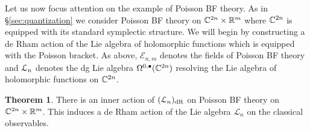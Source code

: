 \documentclass[11pt, oneside, reqno]{amsart}
\theoremstyle{definition} \newtheorem{definition}{Definition}[section]
\newtheorem{theorem}[definition]{Theorem}
\theoremstyle{definition}
\theoremstyle{remark}
\theoremstyle{definition} \newtheorem{remark}[definition]{Remark}
\theoremstyle{definition} \newtheorem{remarks}[definition]{Remarks}
\theoremstyle{definition} \newtheorem{question}[definition]{Question}
\theoremstyle{definition} \newtheorem*{note}{Note}
\theoremstyle{definition} \newtheorem{example}[definition]{Example}
\theoremstyle{definition} \newtheorem{examples}[definition]{Examples}
\def\bu{\bullet}
\def\cE{\mathcal E}\def\cF{\mathcal F}\def\cG{\mathcal G}\def\cH{\mathcal H}
\newcommand{\mc}[1]{\mathcal{#1}}
\begin{document}
Let us now focus attention on the example of Poisson BF theory.  
As in \S \ref{sec:quantization} we consider Poisson BF theory on $\mathbb C^{2n}\times \mathbb R^m$ where $\mathbb C^{2n}$ is equipped with its standard symplectic structure.
We will begin by constructing a de Rham action of the Lie algebra of holomorphic functions which is equipped with the Poisson bracket. 
As above, $\cE_{n,m}$ denotes the fields of Poisson BF theory and $\mathcal L_n$ denotes the dg Lie algebra $\Omega^{0,\bu}(\CC^{2n})$ resolving the Lie algebra of holomorphic functions on $\mathbb C^{2n}$. 

\begin{theorem} \label{de_rham_holo_action_thm}
There is an inner action of $(\mathcal L_{n})_{\rm dR}$ on Poisson BF theory on $\mathbb C^{2n} \times \mathbb R^m$. 
This induces a de Rham action of the Lie algebra $\mc L_n$ on the classical observables.
\end{theorem}
\end{document}
